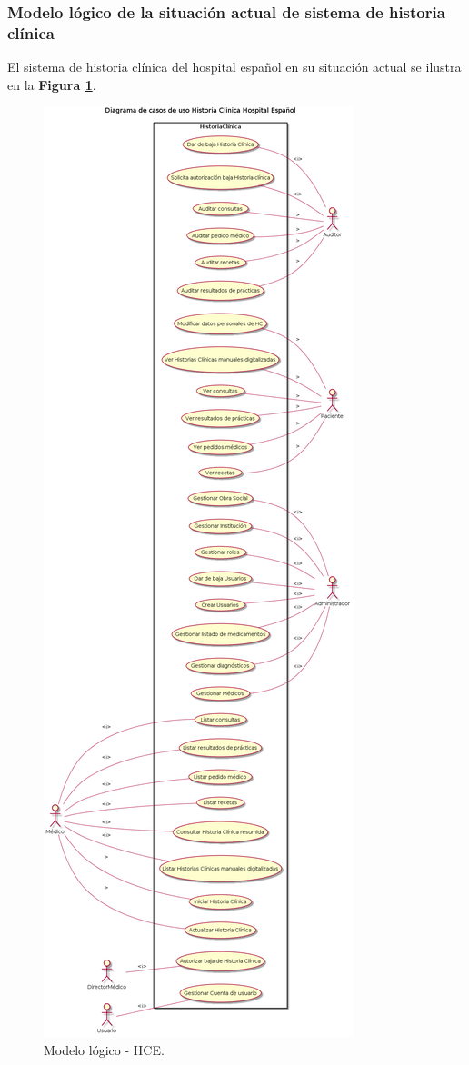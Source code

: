 \subsubsection{Modelo lógico de la situación actual de sistema de historia clínica}
El sistema de historia clínica del hospital español en su situación actual se ilustra en la \textbf{Figura \ref{mlogicoHCE}}.


\begin{figure}
  \centering
  \includegraphics[width=.688\textwidth]{img/tp1/HCHEModeloFuncional}
  \caption{Modelo lógico - HCE.}
  \label{mlogicoHCE}
\end{figure}


